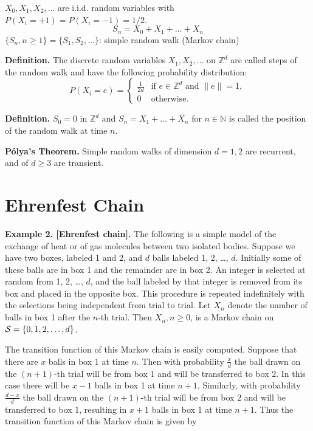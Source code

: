 \documentclass[12pt,openany]{book}
\theoremstyle{definition}
\begin{document}
	\( X_0, X_1, X_2, \ldots \) are i.i.d. random variables with \( P(X_i = +1) = P(X_i = -1) = 1/2 \).
	\[ S_n = X_0 + X_1 + \ldots + X_n \]
	\( \{S_n, n \geq 1\} = \{S_1, S_2, \ldots \} \): simple random walk (Markov chain)
	
	
	\textbf{Definition.} The discrete random variables \( X_1, X_2, \ldots \) on \( \mathbb{Z}^d \) are called steps of the random walk and have the following probability distribution:
	\[ P(X_i = e) = \begin{cases}
		\frac{1}{2d} & \text{if } e \in \mathbb{Z}^d \text{ and } \|e\| = 1, \\
		0 & \text{otherwise}.
	\end{cases} \]
	
	\textbf{Definition.} \( S_0 = 0 \) in \( \mathbb{Z}^d \) and \( S_n = X_1 + \ldots + X_n \) for \( n \in \mathbb{N} \) is called the position of the random walk at time \( n \).
	
	\textbf{Pólya’s Theorem.} Simple random walks of dimension \( d = 1,2 \) are recurrent, and of \( d \geq 3 \) are transient.
	
	\section{Ehrenfest Chain}
	
	\textbf{Example 2. [Ehrenfest chain].} The following is a simple model of the exchange of heat or of gas molecules between two isolated bodies. Suppose we have two boxes, labeled 1 and 2, and \( d \) balls labeled 1, 2, \ldots, \( d \). Initially some of these balls are in box 1 and the remainder are in box 2. An integer is selected at random from 1, 2, \ldots, \( d \), and the ball labeled by that integer is removed from its box and placed in the opposite box. This procedure is repeated indefinitely with the selections being independent from trial to trial. Let \( X_n \) denote the number of balls in box 1 after the \( n \)-th trial. Then \( X_n, n \geq 0 \), is a Markov chain on \( \mathcal{S} = \set{0,1,2,\dots,d}\).
	
	The transition function of this Markov chain is easily computed. Suppose that there are \( x \) balls in box 1 at time \( n \). Then with probability \( \frac{x}{d} \) the ball drawn on the \( (n + 1) \)-th trial will be from box 1 and will be transferred to box 2. In this case there will be \( x - 1 \) balls in box 1 at time \( n + 1 \). Similarly, with probability \( \frac{d - x}{d} \) the ball drawn on the \( (n + 1) \)-th trial will be from box 2 and will be transferred to box 1, resulting in \( x + 1 \) balls in box 1 at time \( n + 1 \). Thus the transition function of this Markov chain is given by
	
\end{document}
